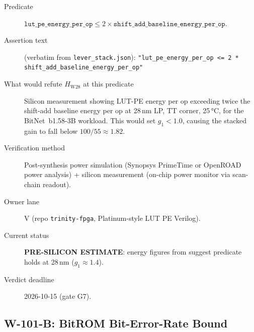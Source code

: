 \begin{description}
  \item[Predicate] \(\mathtt{lut\_pe\_energy\_per\_op}
    \leq 2 \times \mathtt{shift\_add\_baseline\_energy\_per\_op}\).
  \item[Assertion text] (verbatim from \texttt{lever\_stack.json}):
    \texttt{"lut\_pe\_energy\_per\_op <= 2 * shift\_add\_baseline\_energy\_per\_op"}
  \item[What would refute \(H_{\mathrm{W28}}\) at this predicate]
    Silicon measurement showing LUT-PE energy per op exceeding twice the
    shift-add baseline energy per op at 28\,nm LP, TT corner, 25\,°C,
    for the BitNet~b1.58-3B workload.  This would set \(g_{1} < 1.0\),
    causing the stacked gain to fall below \(100/55 \approx 1.82\).
  \item[Verification method] Post-synthesis power simulation (Synopsys PrimeTime
    or OpenROAD power analysis) + silicon measurement (on-chip power monitor
    via scan-chain readout).
  \item[Owner lane] V (repo \texttt{trinity-fpga}, Platinum-style LUT PE Verilog).
  \item[Current status] \textbf{PRE-SILICON ESTIMATE}: energy figures from
    \cite{platinum_lut_pe_2026} suggest predicate holds at 28\,nm (\(g_{1} \approx 1.4\)).
  \item[Verdict deadline] 2026-10-15 (gate G7).
\end{description}

\subsection{W-101-B: BitROM Bit-Error-Rate Bound}
\label{sec:w101b}

